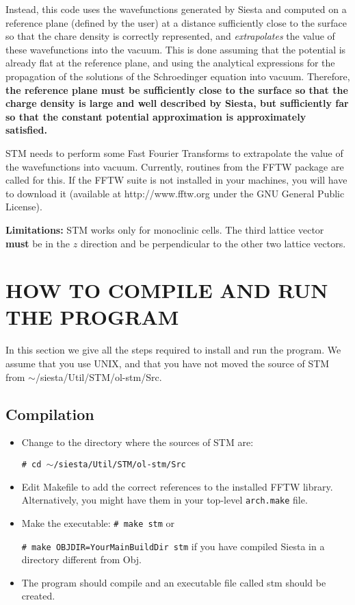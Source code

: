Instead, this code uses the wavefunctions generated by {\sc Siesta}
and computed on a reference plane (defined by the user)
at a distance sufficiently close to the surface so that the
chare density is correctly represented, and {\em extrapolates}
the value of these wavefunctions into the vacuum. This is done assuming
that the potential is already flat at the reference plane,
and using the analytical expressions for the propagation of the
solutions of the Schroedinger equation into vacuum. Therefore, {\bf the
reference plane must be sufficiently close to the surface
so that the charge density is large and well described by {\sc Siesta},
but sufficiently far so that the constant potential approximation
is approximately satisfied.}

{\sc STM} needs to perform some Fast Fourier Transforms to
extrapolate the value of the wavefunctions into vacuum.
Currently, routines from the FFTW package are called for this.
If the FFTW suite is not installed in your machines, you
will have to download it (available at http://www.fftw.org
under the GNU General Public License).

\noindent
{\bf Limitations:} {\sc STM} works only for monoclinic cells.
The third lattice vector {\bf must} be in the $z$ direction
and be perpendicular to the other two lattice vectors.

\section{HOW TO COMPILE AND RUN THE PROGRAM}

In this section we give all the steps required to install and run the
program.  We assume that you use UNIX, and that you have not moved the
source of {\sc STM} from $\sim$/siesta/Util/STM/ol-stm/Src.

\subsection{Compilation}

  \begin{itemize}

   \item Change to the directory where the sources of {\sc STM} are:

         {\tt \# cd $\sim$/siesta/Util/STM/ol-stm/Src}

   \item Edit Makefile to add the correct references to the installed
     FFTW library. Alternatively, you might have them in your top-level
     \texttt{arch.make} file.

   \item Make the executable:
         {\tt \# make stm} or
     
         {\tt \# make OBJDIR=YourMainBuildDir stm} if you have
         compiled Siesta in a directory different from Obj.

   \item The program should compile and an executable file called
         stm should be created.

  \end{itemize}


